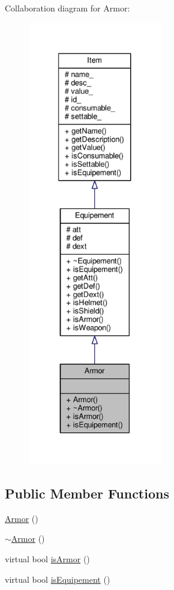 Collaboration diagram for Armor\-:\nopagebreak
\begin{figure}[H]
\begin{center}
\leavevmode
\includegraphics[height=550pt]{class_armor__coll__graph}
\end{center}
\end{figure}
\subsection*{Public Member Functions}
\begin{DoxyCompactItemize}
\item 
\hyperlink{class_armor_a23323e95bbeb488eb6fe54cbd83d49a2}{Armor} ()
\item 
\hyperlink{class_armor_a1cb22d4e87d0ec24a30de40873632945}{$\sim$\-Armor} ()
\item 
virtual bool \hyperlink{class_armor_a729b27c94ea9de6b6bb383e9b93c70c0}{is\-Armor} ()
\item 
virtual bool \hyperlink{class_armor_a6688c63e028c1fb79df0838d2cad5a55}{is\-Equipement} ()
\end{DoxyCompactItemize}
